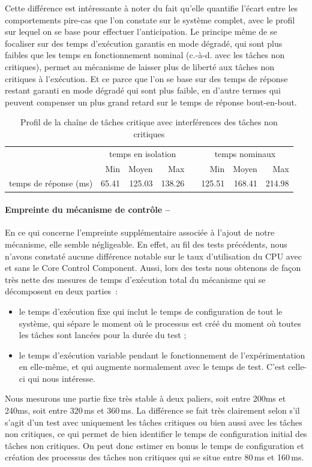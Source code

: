 \documentclass[french, a4paper, 11pt, twoside, pdftex]{StyleThese}
\begin{document}
 Cette différence est intéressante à noter du fait qu'elle quantifie l'écart entre les comportements pire-cas que l'on constate sur le système complet, avec le profil sur lequel on se base pour effectuer l'anticipation. Le principe même de se focaliser sur des temps d'exécution garantis en mode dégradé, qui sont plus faibles que les temps en fonctionnement nominal (c.-à-d. avec les tâches non critiques), permet au mécanisme de laisser plus de liberté aux tâches non critiques à l'exécution. Et ce parce que l'on se base sur des temps de réponse restant garanti en mode dégradé qui sont plus faible, en d'autre termes qui peuvent compenser un plus grand retard sur le temps de réponse bout-en-bout. 
 
\begin{table}[ht]
	\centering
	\caption{Profil de la chaîne de tâches critique avec interférences des tâches non critiques}
	\label{tab:TaskChain_nominal}
	\begin{tabular}{@{}lrrrcrrr@{}}
		\toprule
		& \multicolumn{3}{c}{temps en isolation} &\phantom&\multicolumn{3}{c}{temps nominaux} \\
		\cmidrule{2-4} \cmidrule{6-8} 
		&   Min  & Moyen &  Max   &&  Min  & Moyen & Max 		\\
		\midrule
		temps de réponse (ms) &  65.41 & 125.03 & 138.26 && 125.51 & 168.41 & 214.98  	\\
		\bottomrule
	\end{tabular}
\end{table} 

\paragraph{Empreinte du mécanisme de contrôle -- }En ce qui concerne l'empreinte supplémentaire associée à l'ajout de notre mécanisme, elle semble négligeable. En effet, au fil des tests précédents, nous n'avons constaté aucune différence notable sur le taux d'utilisation du CPU avec et sans le Core Control Component. Aussi, lors des tests nous obtenons de façon très nette des mesures de temps d'exécution total du mécanisme qui se décomposent en deux parties~: 
\begin{itemize}
	\item le temps d'exécution fixe qui inclut le temps de configuration de tout le système, qui sépare le moment où le processus est créé du moment où toutes les tâches sont lancées pour la durée du test ;
	\item le temps d'exécution variable pendant le fonctionnement de l'expérimentation en elle-même, et qui augmente normalement avec le temps de test. C'est celle-ci qui nous intéresse.
\end{itemize}
Nous mesurons une partie fixe très stable à deux paliers, soit entre 200ms et 240ms, soit entre 320\,ms et 360\,ms. La différence se fait très clairement selon s'il s'agit d'un test avec uniquement les tâches critiques ou bien aussi avec les tâches non critiques, ce qui permet de bien identifier le temps de configuration initial des tâches non critiques. On peut donc estimer en bonus le temps de configuration et création des processus des tâches non critiques qui se situe entre 80\,ms et 160\,ms.  
\end{document}
